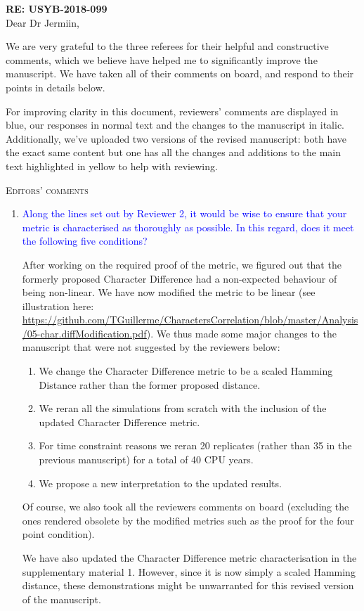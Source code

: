\documentclass[12pt,letterpaper]{article}
\renewcommand{\section}[1]{%
\bigskip
\begin{center}
\begin{Large}
\normalfont\scshape #1
\medskip
\end{Large}
\end{center}}
\begin{document}
\textbf{RE: USYB-2018-099}\\
\bigskip
Dear Dr Jermiin,\\
\bigskip

We are very grateful to the three referees for their helpful and constructive comments, which we believe have helped me to significantly improve the manuscript.
We have taken all of their comments on board, and respond to their points in details below.

For improving clarity in this document, reviewers' comments are displayed in blue, our responses in normal text and the changes to the manuscript in italic.
Additionally, we've uploaded two versions of the revised manuscript: both have the exact same content but one has all the changes and additions to the main text highlighted in yellow to help with reviewing.

\section{Editors' comments}

\begin{enumerate}
\label{metric_change}

\item{\textcolor{blue}{Along the lines set out by Reviewer 2, it would be wise to ensure that your metric is characterised as thoroughly as possible. In this regard, does it meet the following five conditions?}}

After working on the required proof of the metric, we figured out that the formerly proposed Character Difference had a non-expected behaviour of being non-linear.
We have now modified the metric to be linear (see illustration here: \url{https://github.com/TGuillerme/CharactersCorrelation/blob/master/Analysis/05-char.diffModification.pdf}).
We thus made some major changes to the manuscript that were not suggested by the reviewers below:
\begin{enumerate}
    \item We change the Character Difference metric to be a scaled Hamming Distance rather than the former proposed distance.
    \item We reran all the simulations from scratch with the inclusion of the updated Character Difference metric.
    \item For time constraint reasons we reran 20 replicates (rather than 35 in the previous manuscript) for a total of 40 CPU years.
    \item We propose a new interpretation to the updated results.
\end{enumerate}

Of course, we also took all the reviewers comments on board (excluding the ones rendered obsolete by the modified metrics such as the proof for the four point condition).

We have also updated the Character Difference metric characterisation in the supplementary material 1.
However, since it is now simply a scaled Hamming distance, these demonstrations might be unwarranted for this revised version of the manuscript.

\end{enumerate}
\end{document}
